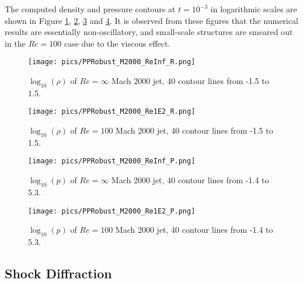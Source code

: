 The computed density and pressure contours at $t=10^{-3}$ in logarithmic scales are shown in Figure \ref{fig:M2000_ReInf_R}, \ref{fig:M2000_Re1E2_R}, \ref{fig:M2000_ReInf_P} and \ref{fig:M2000_Re1E2_P}.
It is observed from these figures that the numerical results are essentially non-oscillatory, and small-scale structures are smeared out in the $Re=100$ case due to the viscous effect.

\begin{figure}[htbp]
    \centering
    \texttt{[image: pics/PPRobust\_M2000\_ReInf\_R.png]}
    \caption{$\log_{10}(\rho)$ of $Re=\infty$ Mach 2000 jet, 40 contour lines from -1.5 to 1.5.}
    \label{fig:M2000_ReInf_R}
\end{figure}

\begin{figure}[htbp]
    \centering
    \texttt{[image: pics/PPRobust\_M2000\_Re1E2\_R.png]}
    \caption{$\log_{10}(\rho)$ of $Re=100$ Mach 2000 jet, 40 contour lines from -1.5 to 1.5.}
    \label{fig:M2000_Re1E2_R}
\end{figure}

\begin{figure}[htbp]
    \centering
    \texttt{[image: pics/PPRobust\_M2000\_ReInf\_P.png]}
    \caption{$\log_{10}(p)$ of $Re=\infty$ Mach 2000 jet, 40 contour lines from -1.4 to 5.3.}
    \label{fig:M2000_ReInf_P}
\end{figure}

\begin{figure}[htbp]
    \centering
    \texttt{[image: pics/PPRobust\_M2000\_Re1E2\_P.png]}
    \caption{$\log_{10}(p)$ of $Re=100$ Mach 2000 jet, 40 contour lines from -1.4 to 5.3.}
    \label{fig:M2000_Re1E2_P}
\end{figure}

\subsection{Shock Diffraction}

